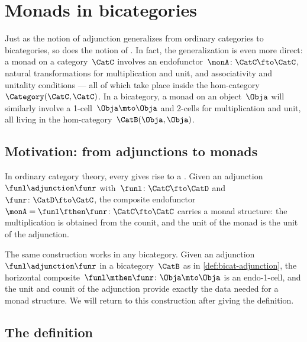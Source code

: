 
\section{Monads in bicategories}
\label{sec:bicats-monads}

Just as the notion of adjunction generalizes from ordinary categories to bicategories, so does the notion of .
In fact, the generalization is even more direct: a monad on a category~$\CatC$ involves an endofunctor~$\monA \colon \CatC \fto \CatC$, natural transformations for multiplication and unit, and associativity and unitality conditions --- all of which take place inside the hom-category~$\Category(\CatC, \CatC)$.
In a bicategory, a monad on an object~$\Obja$ will similarly involve a 1-cell~$\Obja \mto \Obja$ and 2-cells for multiplication and unit, all living in the hom-category~$\CatB(\Obja, \Obja)$.

\subsection{Motivation: from adjunctions to monads}

In ordinary category theory, every  gives rise to a .
Given an adjunction~$\funl \adjunction \funr$ with~$\funl \colon \CatC \fto \CatD$ and~$\funr \colon \CatD \fto \CatC$, the composite endofunctor~$\monA = \funl \fthen \funr \colon \CatC \fto \CatC$ carries a monad structure: the multiplication is obtained from the counit, and the unit of the monad is the unit of the adjunction.

The same construction works in any bicategory.
Given an adjunction~$\funl \adjunction \funr$ in a bicategory~$\CatB$ as in \cref{def:bicat-adjunction}, the horizontal composite~$\funl \mthen \funr \colon \Obja \mto \Obja$ is an endo-1-cell, and the unit and counit of the adjunction provide exactly the data needed for a monad structure.
We will return to this construction after giving the definition.

\subsection{The definition}

